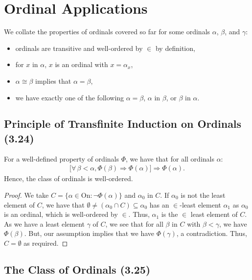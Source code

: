 \section{Ordinal Applications}

We collate the properties of ordinals covered so far
for some ordinals $\alpha$, $\beta$, and $\gamma$:
\begin{itemize}
    \item ordinals are transitive and well-ordered by $\in$ by definition,
    \item for $x$ in $\alpha$, $x$ is an ordinal with $x = \alpha_x$,
    \item $\alpha \cong \beta$ implies that $\alpha = \beta$,
    \item we have exactly one of the following $\alpha = \beta$, 
        $\alpha$ in $\beta$, or $\beta$ in $\alpha$.
\end{itemize}

\subsection{Principle of Transfinite Induction on Ordinals (3.24)} \label{3.24}

For a well-defined property of ordinals $\Phi$, we have
that for all ordinals $\alpha$: \begin{align*}
    \bigl[
        \forall \, \beta < \alpha, \Phi(\beta) 
        \Longrightarrow \Phi(\alpha)
    \bigr] \Longrightarrow \Phi(\alpha). \tag{$\ast$}
\end{align*} Hence, the class of ordinals is well-ordered.

\begin{proof}
    We take $C = \{\alpha \in \text{On} : \neg \Phi(\alpha)\}$ and $\alpha_0$
    in $C$. If $\alpha_0$ is not the least element of $C$, we have that
    $\emptyset \neq (\alpha_0 \cap C) \subseteq \alpha_0$ has an $\in$-least 
    element $\alpha_1$ as $\alpha_0$ is an ordinal, which is well-ordered by $\in$.
    Thus, $\alpha_1$ is the $\in$ least element of $C$.
    As we have a least element $\gamma$ of $C$, we see that for all $\beta$ in $C$ with
    $\beta < \gamma$, we have $\Phi(\beta)$. But, our assumption implies that
    we have $\Phi(\gamma)$, a contradiction. Thus, $C = \emptyset$ as required.
\end{proof}

\subsection{The Class of Ordinals (3.25)} \label{3.25}

